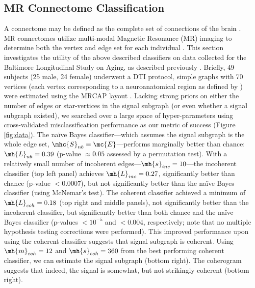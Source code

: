 \documentclass[10pt,journal,cspaper,compsoc]{IEEEtran}
\begin{document}

\subsection{MR Connectome Classification} %
\label{sub:mr_connectome_classification}

A connectome may be defined as the complete set of connections of the brain \cite{Sporns2010}.  MR connectomes utilize multi-modal Magnetic Resonance (MR) imaging to determine both the vertex and edge set for each individual \cite{Hagmann2010}.  This section investigates the utility of the above described classifiers on data collected for the Baltimore Longitudinal Study on Aging, as described previously \cite{OHBM10}.  Briefly, 49 subjects (25 male, 24 female) underwent a DTI protocol, simple graphs with 70 vertices (each vertex corresponding to a neuroanatomical region as defined by \cite{Desikan2006}) were estimated using the MRCAP layout \cite{BMES10}.  Lacking strong priors on either the number of edges or star-vertices in the signal subgraph (or even whether a signal subgraph existed), we searched over a large space of hyper-parameters using cross-validated misclassification performance as our metric of success (Figure \ref{fig:data}).  The na\"ive Bayes classifier---which assumes the signal subgraph is the whole edge set, $\mhc{S}_{nb}=\mc{E}$---performs marginally better than chance: $\mh{L}_{nb}=0.39$ (p-value $\approx 0.05$ assessed by a permutation test).  With a relatively small number of incoherent edges---$\mh{s}_{inc}=10$---the incoherent classifier (top left panel) achieves $\mh{L}_{inc}=0.27$, significantly better than chance (p-value $<0.0007$), but not significantly better than the na\"ive Bayes classifier (using McNemar's test).  The coherent classifier achieved a minimum of $\mh{L}_{coh}=0.18$ (top right and middle panels), not significantly better than the incoherent classifier, but significantly better than both chance and the na\"ive Bayes classifier (p-values $<10^{-5}$ and $<0.004$, respectively; note that no multiple hypothesis testing corrections were performed).  This improved performance upon using the coherent classifier suggests that signal subgraph is coherent. Using $\mh{m}_{coh}=12$ and $\mh{s}_{coh}=360$ from the best performing coherent classifier, we can estimate the signal subgraph (bottom right).  The coherogram suggests that indeed, the signal is somewhat, but not strikingly coherent (bottom right).
\end{document}

